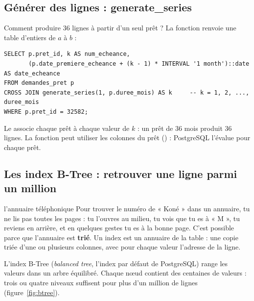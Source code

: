 \subsection{Générer des lignes : generate\_series}

Comment produire 36 lignes à partir d'un seul prêt ? La fonction  renvoie
une table d'entiers de $a$ à $b$ :
\begin{lstlisting}[style=sql]
SELECT p.pret_id, k AS num_echeance,
       (p.date_premiere_echeance + (k - 1) * INTERVAL '1 month')::date AS date_echeance
FROM demandes_pret p
CROSS JOIN generate_series(1, p.duree_mois) AS k     -- k = 1, 2, ..., duree_mois
WHERE p.pret_id = 32582;
\end{lstlisting}
Le  associe chaque prêt à chaque valeur de $k$ : un prêt de 36 mois produit 36 lignes.
La fonction peut utiliser les colonnes du prêt () : PostgreSQL l'évalue pour chaque
prêt.

\subsection{Les index B-Tree : retrouver une ligne parmi un million}

\begin{analogie}{l'annuaire téléphonique}
Pour trouver le numéro de « Koné » dans un annuaire, tu ne lis pas toutes les pages : tu l'ouvres au
milieu, tu vois que tu es à « M », tu reviens en arrière, et en quelques gestes tu es à la bonne page.
C'est possible parce que l'annuaire est \textbf{trié}. Un index est un annuaire de la table : une copie
triée d'une ou plusieurs colonnes, avec pour chaque valeur l'adresse de la ligne.
\end{analogie}

L'index B-Tree (\emph{balanced tree}, l'index par défaut de PostgreSQL) range les valeurs dans un arbre
équilibré. Chaque nœud contient des centaines de valeurs : trois ou quatre niveaux suffisent pour
plus d'un million de lignes (figure~\ref{fig:btree}).

